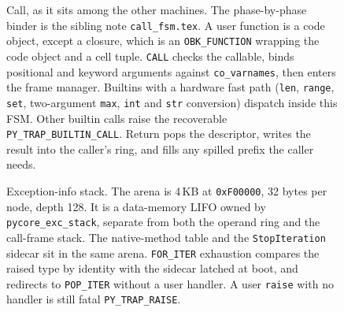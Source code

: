 \begin{figure}[htbp]
\centering
{}
\caption{Call, as it sits among the other machines.
The phase-by-phase binder is the sibling note \texttt{call\_fsm.tex}.
A user function is a code object, except a closure, which is an \texttt{OBK\_FUNCTION} wrapping the code object and a cell tuple.
\texttt{CALL} checks the callable, binds positional and keyword arguments against \texttt{co\_varnames}, then enters the frame manager.
Builtins with a hardware fast path (\texttt{len}, \texttt{range}, \texttt{set}, two-argument \texttt{max}, \texttt{int} and \texttt{str} conversion) dispatch inside this FSM.
Other builtin calls raise the recoverable \texttt{PY\_TRAP\_BUILTIN\_CALL}.
Return pops the descriptor, writes the result into the caller's ring, and fills any spilled prefix the caller needs.}
\label{fig:call}
\end{figure}

\begin{figure}[htbp]
\centering
{}
\caption{Exception-info stack.
The arena is 4\,KB at \texttt{0xF00000}, 32 bytes per node, depth 128.
It is a data-memory LIFO owned by \texttt{pycore\_exc\_stack}, separate from both the operand ring and the call-frame stack.
The native-method table and the \texttt{StopIteration} sidecar sit in the same arena.
\texttt{FOR\_ITER} exhaustion compares the raised type by identity with the sidecar latched at boot, and redirects to \texttt{POP\_ITER} without a user handler.
A user \texttt{raise} with no handler is still fatal \texttt{PY\_TRAP\_RAISE}.}
\label{fig:exc}
\end{figure}

